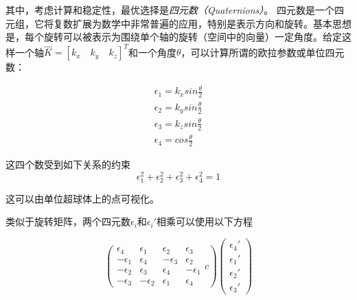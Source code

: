 其中，考虑计算和稳定性，最优选择是\emph{四元数（Quaternions）}。 四元数是一个四元组，它将复数扩展为数学中非常普遍的应用，特别是表示方向和旋转。基本思想是，每个旋转可以被表示为围绕单个轴的旋转（空间中的向量）一定角度。给定这样一个轴$\hat{K}=[k_x\quad k_y\quad k_z]^T$和一个角度$\theta$，可以计算所谓的欧拉参数或单位四元数：

\begin{eqnarray}
\epsilon_1=k_x sin \frac{\theta}{2}\\
\epsilon_2=k_y sin \frac{\theta}{2}\\
\epsilon_3=k_z sin \frac{\theta}{2}\\
\epsilon_4=cos\frac{\theta}{2}
\end{eqnarray}

这四个数受到如下关系的约束
\begin{equation}
\epsilon_1^2+\epsilon_2^2+\epsilon_3^2+\epsilon_4^2=1
\end{equation}

这可以由单位超球体上的点可视化。


类似于旋转矩阵，两个四元数$\epsilon_i$和$\epsilon_i'$相乘可以使用以下方程

\begin{equation}
\left(
\begin{array}{cccc}
\epsilon_4 & \epsilon_1 & \epsilon_2 & \epsilon_3\\
-\epsilon_1 & \epsilon_4 & -\epsilon_3 & \epsilon_2\\
-\epsilon_2 & \epsilon_3 & \epsilon_4 & -\epsilon_1\\
-\epsilon_3 & -\epsilon_2 & \epsilon_1 & \epsilon_4
\end{array}{c}
\right)
\left(\begin{array}{c}\epsilon_4'\\\epsilon_1'\\\epsilon_2'\\\epsilon_3'\end{array}\right)
\end{equation}

